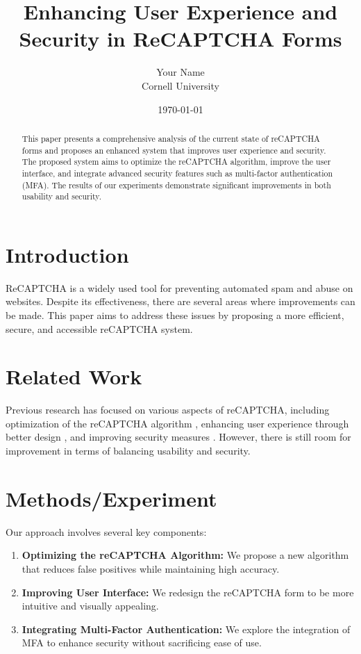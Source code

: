 \documentclass{article}
\title{Enhancing User Experience and Security in ReCAPTCHA Forms}
\author{Your Name \\ Cornell University}
\date{\today}
\begin{document}
\maketitle

\begin{abstract}
This paper presents a comprehensive analysis of the current state of reCAPTCHA forms and proposes an enhanced system that improves user experience and security. The proposed system aims to optimize the reCAPTCHA algorithm, improve the user interface, and integrate advanced security features such as multi-factor authentication (MFA). The results of our experiments demonstrate significant improvements in both usability and security.
\end{abstract}

\section{Introduction}
ReCAPTCHA is a widely used tool for preventing automated spam and abuse on websites. Despite its effectiveness, there are several areas where improvements can be made. This paper aims to address these issues by proposing a more efficient, secure, and accessible reCAPTCHA system.

\section{Related Work}
Previous research has focused on various aspects of reCAPTCHA, including optimization of the reCAPTCHA algorithm \cite{ref1}, enhancing user experience through better design \cite{ref2}, and improving security measures \cite{ref3}. However, there is still room for improvement in terms of balancing usability and security.

\section{Methods/Experiment}
Our approach involves several key components:
\begin{enumerate}
    \item \textbf{Optimizing the reCAPTCHA Algorithm:} We propose a new algorithm that reduces false positives while maintaining high accuracy.
    \item \textbf{Improving User Interface:} We redesign the reCAPTCHA form to be more intuitive and visually appealing.
    \item \textbf{Integrating Multi-Factor Authentication:} We explore the integration of MFA to enhance security without sacrificing ease of use.
\end{enumerate}
\end{document}
